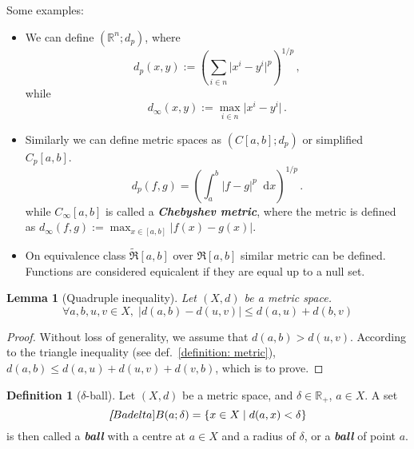 \documentclass[openany]{book}
\newcommand*{\indexbf}[1]{\emph{\textbf{#1}}\index{#1}} %
\theoremstyle{plain}
\newtheorem{lemma}{Lemma} %
\theoremstyle{definition}
\newtheorem{definition}{Definition}[section] %
\newcommand{\dif}{\mathop{}\!\mathrm{d}} %
\newcommand{\emphbf}[1]{\emph{\textbf{#1}}}
\begin{document}
Some examples:
\begin{itemize}
	\item 
	We can define $(\mathbb R^n; d_p)$, where
	\begin{equation}\label{equation:d_p}
		d_p (x, y) := \left(
			\sum_{i \in n}\big|x^i - y^i \big|^p \right)^{1/p}\,,
	\end{equation}
	while
	\begin{equation}\label{equation:d_infty}
		d_\infty (x, y) :=
		\max_{i \in n} \big|x^i - y^i\big|\,.
	\end{equation}
	\item 
	Similarly we can define metric spaces as $(C[a, b]; d_p)$ or simplified $C_p[a, b]$. 
	\begin{equation}
		d_p(f, g) =
		\left(
			\int^b_a \big| f - g \big|^p \dif x
		\right) ^{1/p}\,.
	\end{equation}
	while $C_\infty[a, b]$ is called a \indexbf{Chebyshev metric}, 
	where the metric is defined as $d_\infty(f, g) := \max_{x \in [a, b]} |f(x) - g(x)|$.
	\item 
	On equivalence class $\tilde {\mathfrak R}[a,b]$ over $\mathfrak R[a,b]$ similar metric can be defined. 
	Functions are considered equicalent if they are equal up to a null set. 
\end{itemize}

\begin{lemma}[Quadruple inequality]\label{lemma: quadruple inequality}
	Let $(X,d)$ be a metric space. 
	\begin{equation}\label{equation: quadruple inequality}
		\forall a, b, u, v \in X,\; \big| d(a, b) - d(u, v) \big| \leq d(a, u) + d(b, v) 
	\end{equation}
\end{lemma}
\begin{proof}
	Without loss of generality, we assume that $d(a, b) > d(u, v)$. 
	According to the triangle inequality (see def.~\ref{definition: metric}), $d(a, b) \leq d(a, u) + d(u, v) + d(v,b)$, which is to prove.  
\end{proof}

\begin{definition}[$\delta$-ball]\label{definition: delta ball}
	Let $(X, d)$ be a metric space, and $\delta \in \mathbb R_+$, $a \in X$. 
	A set
	\begin{equation*}
		\indexbf[B a delta]{B(a; \delta)} = \{x \in X \mid d(a, x) < \delta\}
	\end{equation*}
	is then called a \indexbf{ball} with a centre at $a \in X$ and a radius of $\delta$, or a \emphbf{ball} of point $a$.
\end{definition}
\end{document}
